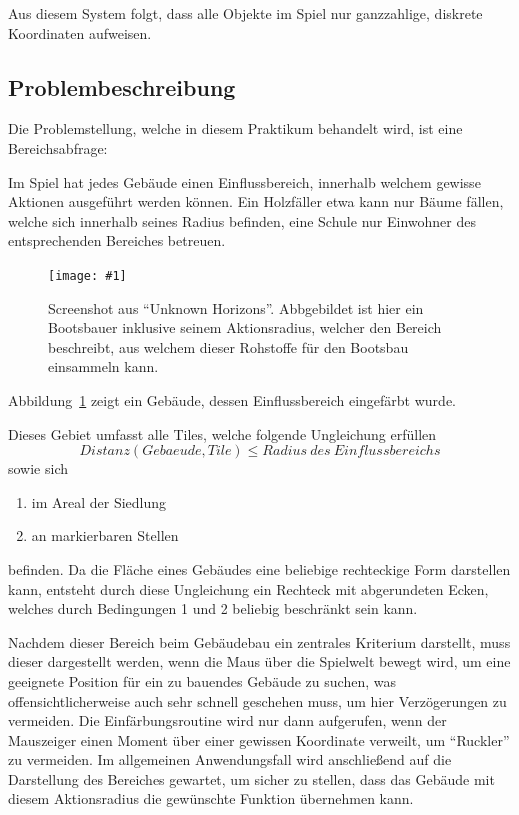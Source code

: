 \documentclass[%
			paper=a4,%
			DIV12,
			liststotoc,
			bibtotoc,
			draft=false,%
			titlepage,
			numbers=noendperiod
			]{scrartcl}
\newcommand{\myfig}[5] {
 \begin{figure}[tbph]
	 \centering
	 \texttt{[image: \#1]}
	 \caption[#4]{#5}
	 \label{fig:#2}
 \end{figure}
}
\begin{document}
Aus diesem System folgt, dass alle Objekte im Spiel nur ganzzahlige, diskrete Koordinaten aufweisen.


\subsection{Problembeschreibung}
Die Problemstellung, welche in diesem Praktikum behandelt wird, ist eine Bereichsabfrage:

Im Spiel hat jedes Gebäude einen Einflussbereich, innerhalb welchem gewisse Aktionen ausgeführt werden können.
Ein Holzfäller etwa kann nur Bäume fällen, welche sich innerhalb seines Radius befinden,
eine Schule nur Einwohner des entsprechenden Bereiches betreuen.
\myfig{img/uh-boatbuilder-overview}{boatbuilder}{width=.8\textwidth}
{Screenshot aus "`Unknown Horizons"'}
{Screenshot aus "`Unknown Horizons"'. Abbgebildet ist hier ein Bootsbauer inklusive seinem Aktionsradius, welcher den Bereich beschreibt, aus welchem dieser Rohstoffe für den Bootsbau einsammeln kann.}
Abbildung\nolinebreak\ \ref{fig:boatbuilder} zeigt ein Gebäude, dessen Einflussbereich eingefärbt wurde.

Dieses Gebiet umfasst alle Tiles, welche folgende Ungleichung erfüllen
\begin{equation}
	Distanz(Gebaeude, Tile) \leq Radius\ des\ Einflussbereichs
\end{equation}
sowie sich
\begin{enumerate}
	\item im Areal der Siedlung 
	\item an markierbaren Stellen
\end{enumerate}
befinden.
Da die Fläche eines Gebäudes eine beliebige rechteckige Form darstellen kann, entsteht durch diese Ungleichung ein Rechteck mit abgerundeten Ecken, welches durch Bedingungen 1 und 2 beliebig beschränkt sein kann.

Nachdem dieser Bereich beim Gebäudebau ein zentrales Kriterium darstellt, muss dieser dargestellt werden, wenn die Maus über die Spielwelt bewegt wird, um eine geeignete Position für ein zu bauendes Gebäude zu suchen, was offensichtlicherweise auch sehr schnell geschehen muss, um hier Verzögerungen zu vermeiden.
Die Einfärbungsroutine wird nur dann aufgerufen, wenn der Mauszeiger einen Moment über einer gewissen Koordinate verweilt, um "`Ruckler"' zu vermeiden. Im allgemeinen Anwendungsfall wird anschließend auf die Darstellung des Bereiches gewartet, um sicher zu stellen, dass das Gebäude mit diesem Aktionsradius die gewünschte Funktion übernehmen kann.
\end{document}

